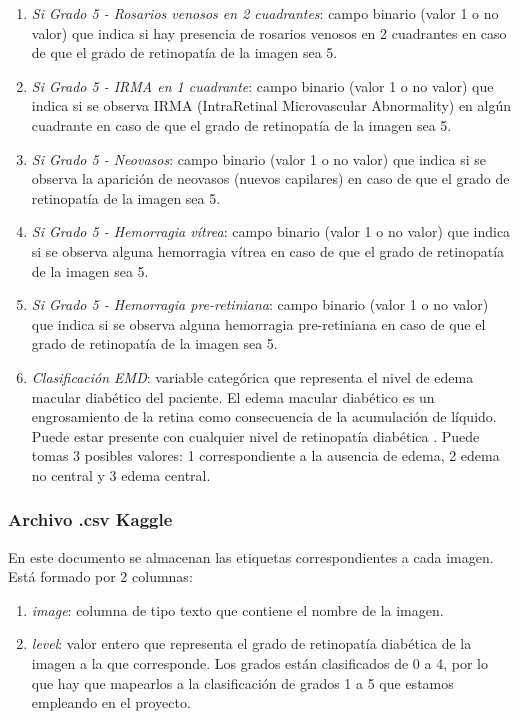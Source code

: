 \begin{enumerate}[itemsep=0.25em]
    \item \textit{Si Grado 5 - Rosarios venosos en 2 cuadrantes}: campo binario (valor 1 o no valor) que indica si hay presencia de rosarios venosos en 2 cuadrantes en caso de que el grado de retinopatía de la imagen sea 5.
    \item \textit{Si Grado 5 - IRMA en 1 cuadrante}: campo binario (valor 1 o no valor) que indica si se observa IRMA (IntraRetinal Microvascular Abnormality) en algún cuadrante en caso de que el grado de retinopatía de la imagen sea 5.
    \item \textit{Si Grado 5 - Neovasos}: campo binario (valor 1 o no valor) que indica si se observa la aparición de neovasos (nuevos capilares) en caso de que el grado de retinopatía de la imagen sea 5.
    \item \textit{Si Grado 5 - Hemorragia vítrea}: campo binario (valor 1 o no valor) que indica si se observa alguna hemorragia vítrea en caso de que el grado de retinopatía de la imagen sea 5.
    \item \textit{Si Grado 5 - Hemorragia pre-retiniana}: campo binario (valor 1 o no valor) que indica si se observa alguna hemorragia pre-retiniana en caso de que el grado de retinopatía de la imagen sea 5.
    \item \textit{Clasificación EMD}: variable categórica que representa el nivel de edema macular diabético del paciente. El edema macular diabético es un engrosamiento de la retina como consecuencia de la acumulación de líquido. Puede estar presente con cualquier nivel de retinopatía diabética \cite{datos:EMD}. Puede tomas 3 posibles valores: 1 correspondiente a la ausencia de edema, 2 edema no central y 3 edema central.
\end{enumerate}

\subsubsection{Archivo .csv Kaggle}

En este documento se almacenan las etiquetas correspondientes a cada imagen. Está formado por 2 columnas:

\begin{enumerate}
    \item \textit{image}: columna de tipo texto que contiene el nombre de la imagen.
    \item \textit{level}: valor entero que representa el grado de retinopatía diabética de la imagen a la que corresponde. Los grados están clasificados de 0 a 4, por lo que hay que mapearlos a la clasificación de grados 1 a 5 que estamos empleando en el proyecto.
\end{enumerate}

